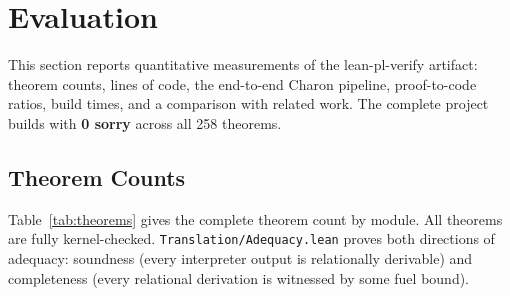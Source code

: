 
\section{Evaluation}
\label{sec:evaluation}

This section reports quantitative measurements of the lean-pl-verify artifact:
theorem counts, lines of code, the end-to-end Charon pipeline,
proof-to-code ratios, build times, and a comparison with related work.
The complete project builds with \textbf{0 sorry} across all 258 theorems.

\subsection{Theorem Counts}

Table~\ref{tab:theorems} gives the complete theorem count by module.
All theorems are fully kernel-checked.
\texttt{Translation/Adequacy.lean} proves both directions of adequacy:
soundness (every interpreter output is relationally derivable) and
completeness (every relational derivation is witnessed by some fuel bound).

